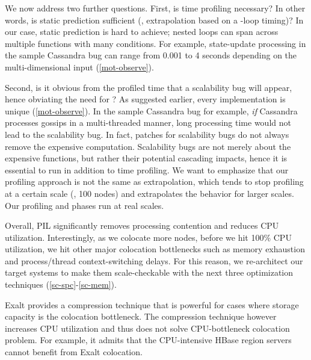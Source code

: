 We now address two further questions.  First, is time profiling necessary?
In other words, is static prediction sufficient (\eg, extrapolation based
on a -loop timing)?  In our case, static prediction is hard
to achieve; nested loops can span across multiple functions with many
 conditions.  For example, state-update processing in
the sample Cassandra bug can range from 0.001 to 4 seconds depending on the
multi-dimensional input (\sec\ref{mot-observe}).  
%






Second, is it obvious from the profiled time that a scalability bug will
appear, hence obviating the need for \sck?  
%
As suggested earlier, every implementation is unique
(\sec\ref{mot-observe}).  In the sample Cassandra bug for example, {\em if} Cassandra
processes gossips in a multi-threaded manner, long processing time would
not lead to the scalability bug.
%
In fact, patches for scalability bugs do not always remove the expensive
computation.
%
Scalability bugs are not merely about the expensive functions, but rather
their potential cascading impacts, hence it is essential to run \sck 
in addition to time profiling.
We want to emphasize that our profiling approach is not the same as
extrapolation, which tends to stop profiling at a certain 
scale (\eg, 100 nodes)
and extrapolates the behavior for larger scales.  Our
profiling and \sck phases run at real scales.


\vfive Overall, PIL significantly removes processing contention and
reduces CPU utilization.  Interestingly, as we colocate more nodes, before
we hit 100\% CPU utilization, we hit other major colocation bottlenecks
such as memory exhaustion and process/thread context-switching delays.
%
For this reason, we re-architect our target systems to make them
scale-checkable with the next three optimization techniques
(\sec\ref{sc-spc}-\sec\ref{sc-mem}).



Exalt \cite{exalt} provides a compression technique that is powerful for
cases where storage capacity is the colocation bottleneck.
The compression technique however increases CPU utilization
and thus does not solve CPU-bottleneck colocation problem.
For example, it admits that the CPU-intensive HBase region servers
cannot benefit from Exalt colocation. 
\fi
